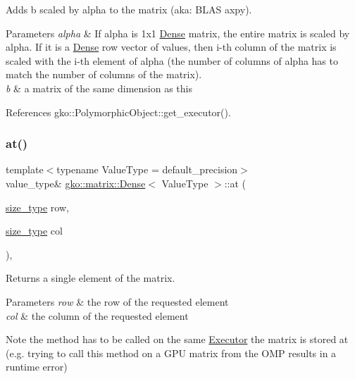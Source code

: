 Adds {\ttfamily b} scaled by {\ttfamily alpha} to the matrix (aka\+: B\+L\+AS axpy). 


\begin{DoxyParams}{Parameters}
{\em alpha} & If alpha is 1x1 \hyperlink{classgko_1_1matrix_1_1Dense}{Dense} matrix, the entire matrix is scaled by alpha. If it is a \hyperlink{classgko_1_1matrix_1_1Dense}{Dense} row vector of values, then i-\/th column of the matrix is scaled with the i-\/th element of alpha (the number of columns of alpha has to match the number of columns of the matrix). \\
\hline
{\em b} & a matrix of the same dimension as this \\
\hline
\end{DoxyParams}


References gko\+::\+Polymorphic\+Object\+::get\+\_\+executor().

\mbox{\label{classgko_1_1matrix_1_1Dense_af0f1af68853537807ca271a296de3cd0}} 
\subsubsection{\texorpdfstring{at()}{at()}\hspace{0.1cm}{\footnotesize\ttfamily [1/4]}}
{\footnotesize\ttfamily template$<$typename Value\+Type = default\+\_\+precision$>$ \\
value\+\_\+type\& \hyperlink{classgko_1_1matrix_1_1Dense}{gko\+::matrix\+::\+Dense}$<$ Value\+Type $>$\+::at (\begin{DoxyParamCaption}\item[{\hyperlink{namespacegko_a6e5c95df0ae4e47aab2f604a22d98ee7}{size\+\_\+type}}]{row,  }\item[{\hyperlink{namespacegko_a6e5c95df0ae4e47aab2f604a22d98ee7}{size\+\_\+type}}]{col }\end{DoxyParamCaption})\hspace{0.3cm}{\ttfamily [inline]}, {\ttfamily [noexcept]}}



Returns a single element of the matrix. 


\begin{DoxyParams}{Parameters}
{\em row} & the row of the requested element \\
\hline
{\em col} & the column of the requested element\\
\hline
\end{DoxyParams}
\begin{DoxyNote}{Note}
the method has to be called on the same \hyperlink{classgko_1_1Executor}{Executor} the matrix is stored at (e.\+g. trying to call this method on a G\+PU matrix from the O\+MP results in a runtime error) 
\end{DoxyNote}


